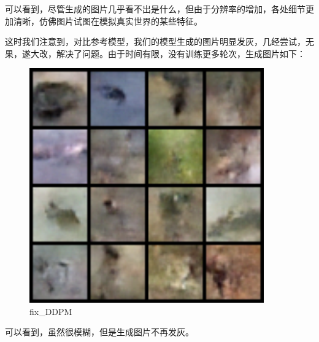 \documentclass{ctexart}
\begin{document}
\noindent
可以看到，尽管生成的图片几乎看不出是什么，但由于分辨率的增加，各处细节更加清晰，仿佛图片试图在模拟真实世界的某些特征。

\noindent
这时我们注意到，对比参考模型，我们的模型生成的图片明显发灰，几经尝试，无果，遂大改，解决了问题。由于时间有限，没有训练更多轮次，生成图片如下：
\begin{figure}[htb]
    \centering
    \includegraphics[width=0.9\textwidth]{sample_fix.png}
    \caption{fix_DDPM}
    \label{fig:cifar10_grid}
\end{figure}

\noindent
可以看到，虽然很模糊，但是生成图片不再发灰。
\end{document}

